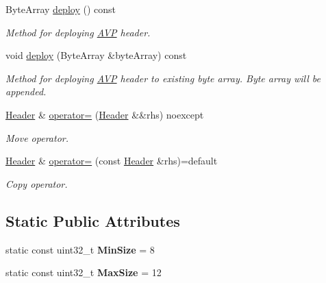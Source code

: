 \begin{DoxyCompactItemize}
Byte\+Array \hyperlink{classDiameter_1_1AVP_1_1Header_adb165b56a7160803480621b3789c972a}{deploy} () const
\begin{DoxyCompactList}\small\item\em Method for deploying \hyperlink{classDiameter_1_1AVP}{A\+VP} header. \end{DoxyCompactList}\item 
void \hyperlink{classDiameter_1_1AVP_1_1Header_ac56e1a44d35cb41d834581834cf17c25}{deploy} (Byte\+Array \&byte\+Array) const
\begin{DoxyCompactList}\small\item\em Method for deploying \hyperlink{classDiameter_1_1AVP}{A\+VP} header to existing byte array. Byte array will be appended. \end{DoxyCompactList}\item 
\hyperlink{classDiameter_1_1AVP_1_1Header}{Header} \& \hyperlink{classDiameter_1_1AVP_1_1Header_a3798fa2ecf6fb48e3d54af4fb874b12c}{operator=} (\hyperlink{classDiameter_1_1AVP_1_1Header}{Header} \&\&rhs) noexcept
\begin{DoxyCompactList}\small\item\em Move operator. \end{DoxyCompactList}\item 
\hyperlink{classDiameter_1_1AVP_1_1Header}{Header} \& \hyperlink{classDiameter_1_1AVP_1_1Header_a739d3c2f35b5e7bdb1072668e69ae1b5}{operator=} (const \hyperlink{classDiameter_1_1AVP_1_1Header}{Header} \&rhs)=default
\begin{DoxyCompactList}\small\item\em Copy operator. \end{DoxyCompactList}\end{DoxyCompactItemize}
\subsection*{Static Public Attributes}
\begin{DoxyCompactItemize}
\item 
\mbox{\label{classDiameter_1_1AVP_1_1Header_ae29333d68885ba5197ce774a5766f66c}} 
static const uint32\+\_\+t {\bfseries Min\+Size} = 8
\item 
\mbox{\label{classDiameter_1_1AVP_1_1Header_a63cf83d400ab8509f274438339afcf36}} 
static const uint32\+\_\+t {\bfseries Max\+Size} = 12
\end{DoxyCompactItemize}


